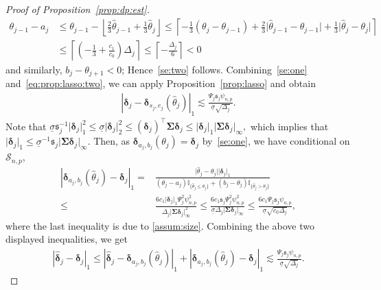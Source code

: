 \documentclass[11pt, a4paper]{article}
\newcommand{\mc}{\mathcal}
\renewcommand{\l}{\left}
\renewcommand{\r}{\right}
\def\wh{\widehat}
\newcommand{\cp}{\theta}
\theoremstyle{definition}
\theoremstyle{definition}
\theoremstyle{definition}
\theoremstyle{definition}
\theoremstyle{definition}
\theoremstyle{remark}
\theoremstyle{definition}
\theoremstyle{definition}
\theoremstyle{definition}
\begin{document}
\begin{proof}[Proof of Proposition~\ref{prop:dp:est}]
	\begin{align*}
	\cp_{j - 1} - a_j &\le \cp_{j - 1} - \l\lfloor\frac{2}{3} \wh\cp_{j - 1} + \frac{1}{3} \wh\cp_j \r\rfloor \le \l\lceil - \frac{1}{3} (\cp_j - \cp_{j - 1}) + \frac{2}{3} \vert \wh\cp_{j - 1} - \cp_{j - 1} \vert + \frac{1}{3} \vert \wh\cp_j - \cp_j \vert \r\rceil
	\\
	&\le \l\lceil\l( -\frac{1}{3} + \frac{c_1}{c_0} \r) \Delta_j \r\rceil \le \l\lceil-\frac{\Delta_j}{6}\r\rceil < 0
	\end{align*}
	and similarly, $b_j - \cp_{j + 1} < 0$; Hence~\ref{se:two} follows.
	Combining~\ref{se:one} and~\eqref{eq:prop:lasso:two}, we can apply Proposition~\ref{prop:lasso} and obtain
	\begin{align*}
	\l\vert \wh{\bm\delta}_j - \bm\delta_{s_j, e_j}(\wh\cp_j) \r\vert_1 \lesssim \frac{\Psi_j \mathfrak{s}_j \psi_{n, p}}{\underline{\sigma} \sqrt{\Delta_j}}.
	\end{align*}
	Note that
	$\underline\sigma \mathfrak{s}_j^{-1}\vert \bm \delta_j\vert_1^2\le\underline\sigma \vert \bm \delta_j\vert_2^2\le(\bm\delta_j)^\top \bm\Sigma \bm\delta_j \le \vert \bm\delta_j \vert_1\vert\bm\Sigma \bm\delta_j \vert_\infty,$
	which implies that $\vert\bm\delta_j\vert_1 \le {\underline\sigma}^{-1}\mathfrak{s}_j\vert\bm\Sigma\bm\delta_j\vert_{\infty}$. 
	Then, as $\bm\delta_{a_j, b_j}(\cp_j) = \bm\delta_j$ by~\ref{se:one}, we have conditional on $\mc S_{n,p}$, 
	\begin{align*}
	\l\vert \bm\delta_{a_j, b_j}(\wh\cp_j) - \bm\delta_j \r\vert_1 
	= & \frac{\vert \wh\cp_j - \cp_j \vert \vert \bm\delta_j \vert_1}{(\cp_j - a_j) \mathbb{I}_{\{\wh\cp_j \le \cp_j\}} + (b_j - \cp_j) \mathbb{I}_{\{\wh\cp_j > \cp_j\}} } \\
	\le & \frac{6 c_1 \vert \bm\delta_j \vert_1  \Psi_j^2 \psi_{n, p}^2 }{ \Delta_j \vert \bm\Sigma \bm\delta_j \vert_\infty^{2}}
	\le \frac{6c_1\mathfrak{s}_j \Psi_j^2\psi_{n, p}^2}{\underline{\sigma} \Delta_j\vert\bm\Sigma\bm\delta_j\vert_\infty} \le \frac{6c_1\Psi_j \mathfrak{s}_j \psi_{n, p}}{\underline{\sigma} \sqrt{c_0\Delta_j}},
	\end{align*}
	where the last inequality is due to \cref{assum:size}.  
	Combining the above two displayed inequalities, we get
	\begin{align*}
	\l\vert \wh{\bm\delta}_j - \bm\delta_j \r\vert_1 \le \l\vert \wh{\bm\delta}_j - \bm\delta_{a_j, b_j}(\wh\cp_j) \r\vert_1 + \l\vert \bm\delta_{a_j, b_j}(\wh\cp_j) - \bm\delta_j \r\vert_1 
	\lesssim \frac{\Psi_j \mathfrak{s}_j \psi_{n, p}}{\underline{\sigma} \sqrt{\Delta_j}}.

\end{align*}
\end{proof}
\end{document}
